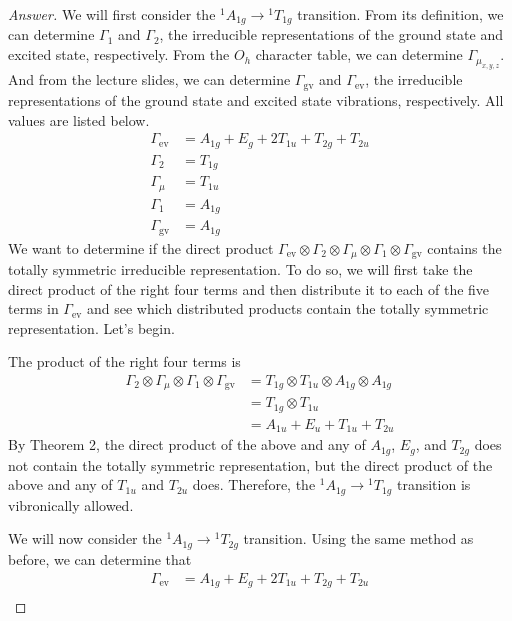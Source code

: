 \documentclass[../psets.tex]{subfiles}
\begin{document}
\begin{enumerate}[label={\Roman*)}]
    \begin{proof}[Answer]
        We will first consider the ${}^1A_{1g}\to{}^1T_{1g}$ transition. From its definition, we can determine $\Gamma_1$ and $\Gamma_2$, the irreducible representations of the ground state and excited state, respectively. From the $O_h$ character table, we can determine $\Gamma_{\mu_{x,y,z}}$. And from the lecture slides, we can determine $\Gamma_\text{gv}$ and $\Gamma_\text{ev}$, the irreducible representations of the ground state and excited state vibrations, respectively. All values are listed below.
        \begin{align*}
            \Gamma_\text{ev} &= A_{1g}+E_g+2T_{1u}+T_{2g}+T_{2u}\\
            \Gamma_2 &= T_{1g}\\
            \Gamma_\mu &= T_{1u}\\
            \Gamma_1 &= A_{1g}\\
            \Gamma_\text{gv} &= A_{1g}
        \end{align*}
        We want to determine if the direct product $\Gamma_\text{ev}\otimes\Gamma_2\otimes\Gamma_\mu\otimes\Gamma_1\otimes\Gamma_\text{gv}$ contains the totally symmetric irreducible representation. To do so, we will first take the direct product of the right four terms and then distribute it to each of the five terms in $\Gamma_\text{ev}$ and see which distributed products contain the totally symmetric representation. Let's begin.\par
        The product of the right four terms is
        \begin{align*}
            \Gamma_2\otimes\Gamma_\mu\otimes\Gamma_1\otimes\Gamma_\text{gv} &= T_{1g}\otimes T_{1u}\otimes A_{1g}\otimes A_{1g}\\
            &= T_{1g}\otimes T_{1u}\\
            &= A_{1u}+E_u+T_{1u}+T_{2u}
        \end{align*}
        By Theorem 2, the direct product of the above and any of $A_{1g}$, $E_g$, and $T_{2g}$ does not contain the totally symmetric representation, but the direct product of the above and any of $T_{1u}$ and $T_{2u}$ does. Therefore, the ${}^1A_{1g}\to{}^1T_{1g}$ transition is vibronically allowed.\par\medskip
        We will now consider the ${}^1A_{1g}\to{}^1T_{2g}$ transition. Using the same method as before, we can determine that
        \begin{align*}
            \Gamma_\text{ev} &= A_{1g}+E_g+2T_{1u}+T_{2g}+T_{2u}\\

\end{align*}
\end{proof}
\end{enumerate}
\end{document}

